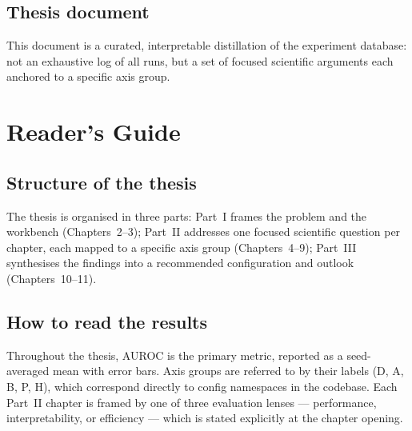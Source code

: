 \subsection{Thesis document}
\label{subsec:intro_thesis_document}

This document is a curated, interpretable distillation of the experiment database: not an exhaustive log of all runs, but a set of focused scientific arguments each anchored to a specific axis group.


\section{Reader's Guide}
\label{sec:intro_readers_guide}

\subsection{Structure of the thesis}
\label{subsec:intro_thesis_structure}

The thesis is organised in three parts: Part~I frames the problem and the workbench (Chapters~2--3); Part~II addresses one focused scientific question per chapter, each mapped to a specific axis group (Chapters~4--9); Part~III synthesises the findings into a recommended configuration and outlook (Chapters~10--11).

\subsection{How to read the results}
\label{subsec:intro_how_to_read}

Throughout the thesis, AUROC is the primary metric, reported as a seed-averaged mean with error bars.
Axis groups are referred to by their labels (D, A, B, P, H), which correspond directly to config namespaces in the codebase.
Each Part~II chapter is framed by one of three evaluation lenses --- performance, interpretability, or efficiency --- which is stated explicitly at the chapter opening.
